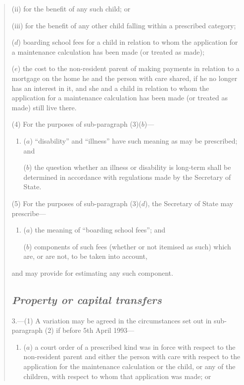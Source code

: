 \documentclass[12pt,a4paper]{article}
\begin{document}
\begin{quotation}
\begin{enumerate}
\begin{enumerate}
(ii) for the benefit of any such child; or

(iii) for the benefit of any other child falling within a prescribed category;
\end{enumerate}

($d$) boarding school fees for a child in relation to whom the application for a maintenance calculation has been made (or treated as made);

($e$) the cost to the non-resident parent of making payments in relation to a mortgage on the home he and the person with care shared, if he no longer has an interest in it, and she and a child in relation to whom the application for a maintenance calculation has been made (or treated as made) still live there.
\end{enumerate}

(4) For the purposes of sub-paragraph (3)($b$)—
\begin{enumerate}\item[]
($a$) “disability” and “illness” have such meaning as may be prescribed; and

($b$) the question whether an illness or disability is long-term shall be determined in accordance with regulations made by the Secretary of State.
\end{enumerate}

(5) For the purposes of sub-paragraph (3)($d$), the Secretary of State may prescribe—
\begin{enumerate}\item[]
($a$) the meaning of “boarding school fees”; and

($b$) components of such fees (whether or not itemised as such) which are, or are not, to be taken into account,
\end{enumerate}
and may provide for estimating any such component.

\subsection*{\itshape Property or capital transfers}

3.---(1) A variation may be agreed in the circumstances set out in sub-paragraph (2)  if before 5th April 1993—
\begin{enumerate}\item[]
($a$) a court order of a prescribed kind was in force with respect to the non-resident parent and either the person with care with respect to the application for the maintenance calculation or the child, or any of the children, with respect to whom that application was made; or


\end{enumerate}
\end{quotation}
\end{document}
